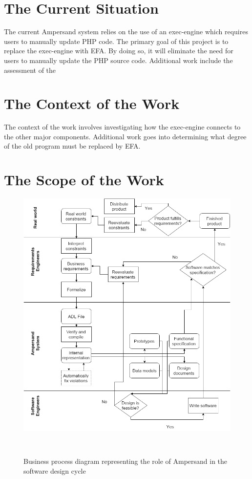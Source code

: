 \documentclass[12pt]{report}
\begin{document}
\section{The Current Situation}\label{sec:CurrentSituation}
The current Ampersand system relies on the use of an exec-engine which requires 
users to manually update PHP code. The primary goal of this project is to 
replace the exec-engine with EFA. By doing so, it will eliminate the need for 
users to manually update the PHP source code. Additional work include the 
assessment of the 
\section{The Context of the Work}\label{sec:ContextOfWork}
The context of the work involves investigating how the exec-engine connects to 
the other major components. Additional work goes into determining what degree 
of the old program must be replaced by EFA.
\section{The Scope of the Work}\label{sec:ScopeOfWork}

\begin{figure}[!htb]
\begin{center}
\includegraphics[width=\textwidth]{../figures/business_process}
\caption{Business process diagram representing the role of Ampersand in the
  software design cycle}~\label{fig:BusinessProcess}
\end{center}
\end{figure}
\end{document}

